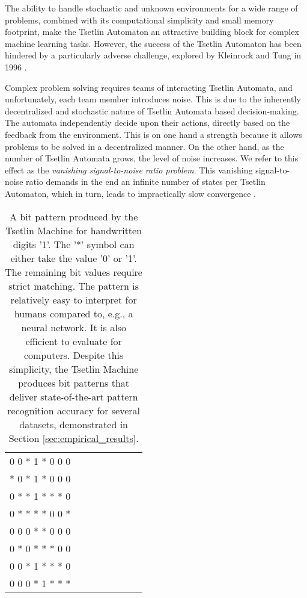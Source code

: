\documentclass[11pt,a4paper]{article}
\begin{document}
The ability to handle stochastic and unknown environments for a wide range of problems, combined with its computational simplicity and small memory footprint, make the Tsetlin Automaton an attractive building block for complex machine learning tasks. However, the success of the Tsetlin Automaton has been hindered by a   particularly adverse challenge, explored by Kleinrock and Tung in 1996 \cite{Tung1996}.

Complex problem solving requires teams of interacting Tsetlin Automata, and unfortunately, each team member introduces noise. This is due to the inherently decentralized and stochastic nature of Tsetlin Automata based decision-making. The automata independently decide upon their actions, directly based on the feedback from the environment. This is on one hand a strength because it allows problems to be solved in a decentralized manner. On the other hand, as the number of Tsetlin Automata grows, the level of noise increases. We refer to this effect as the \emph{vanishing signal-to-noise ratio problem}. This vanishing signal-to-noise ratio demands in the end an infinite number of states per Tsetlin Automaton, which in turn, leads to impractically slow convergence \cite{Narendra1989,Tung1996}.

\begin{table}[!bh]
    \centering
    \begin{tabular}{cccccccc}
            0 0 * 1 * 0 0 0\\
            * 0 * 1 * 0 0 0\\
            0 * * 1 * * * 0\\
            0 * * * * 0 0 *\\
            0 0 0 * * 0 0 0\\
            0 * 0 * * * 0 0\\
            0 0 * 1 * * * 0\\
            0 0 0 * 1 * * *\\
    \end{tabular}
    \caption{A bit pattern produced by the Tsetlin Machine for handwritten digits '1'. The '*' symbol can either take the value '0' or '1'. The remaining bit values require strict matching. The pattern is relatively easy to interpret for humans compared to, e.g., a neural network. It is also efficient to evaluate for computers. Despite this simplicity, the Tsetlin Machine produces bit patterns that deliver state-of-the-art pattern recognition accuracy for several datasets, demonstrated in Section \ref{sec:empirical_results}.}
    \label{tab:bit_pattern}
\end{table}
\end{document}
